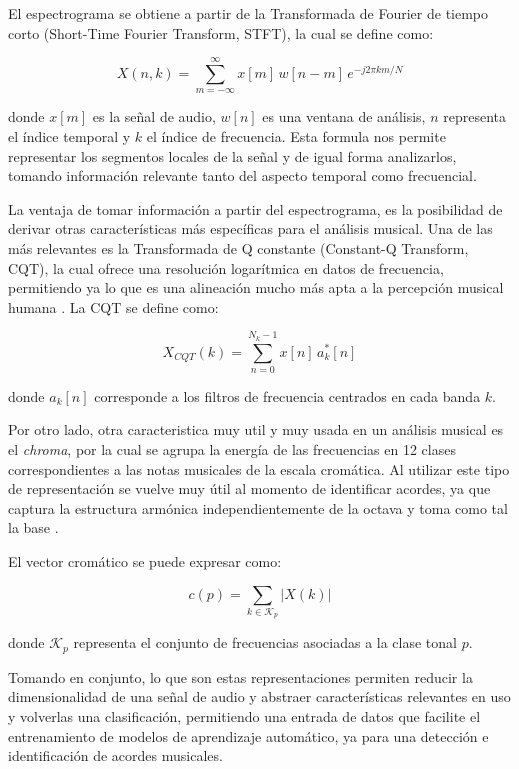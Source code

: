 El espectrograma se obtiene a partir de la Transformada de Fourier de tiempo corto (Short-Time Fourier Transform, STFT), la cual se define como:

\begin{equation}
X(n, k) = \sum_{m=-\infty}^{\infty} x[m] \, w[n - m] \, e^{-j 2 \pi k m / N}
\end{equation}

donde $x[m]$ es la señal de audio, $w[n]$ es una ventana de análisis, $n$ representa el índice temporal y $k$ el índice de frecuencia. Esta formula nos permite representar los segmentos locales de la señal y de igual forma analizarlos, tomando información relevante tanto del aspecto temporal como frecuencial.

La ventaja de tomar información a partir del espectrograma, es la posibilidad de  derivar otras características más específicas para el análisis musical. Una de las más relevantes es la Transformada de Q constante (Constant-Q Transform, CQT), la cual ofrece una resolución logarítmica en datos de frecuencia, permitiendo ya lo que es una alineación mucho más apta a la percepción musical humana \cite{telila2025automatic}. La CQT se define como:

\begin{equation}
X_{CQT}(k) = \sum_{n=0}^{N_k-1} x[n] \, a_k^*[n]
\end{equation}

donde $a_k[n]$ corresponde a los filtros de frecuencia centrados en cada banda $k$.

Por otro lado, otra caracteristica muy util y muy usada en un análisis musical es el \textit{chroma}, por la cual se agrupa la energía de las frecuencias en 12 clases correspondientes a las notas musicales de la escala cromática. Al utilizar este tipo de representación se vuelve muy útil al momento de identificar acordes, ya que captura la estructura armónica independientemente de la octava y toma como tal la base \cite{benetos2013challenges}.

El vector cromático se puede expresar como:

\begin{equation}
c(p) = \sum_{k \in \mathcal{K}_p} |X(k)|
\end{equation}

donde $\mathcal{K}_p$ representa el conjunto de frecuencias asociadas a la clase tonal $p$.

Tomando en conjunto, lo que son estas representaciones permiten reducir la dimensionalidad de una señal de audio y abstraer características relevantes en uso y volverlas una clasificación, permitiendo una entrada de datos que facilite el entrenamiento de modelos de aprendizaje automático, ya para una detección e identificación de acordes musicales.
